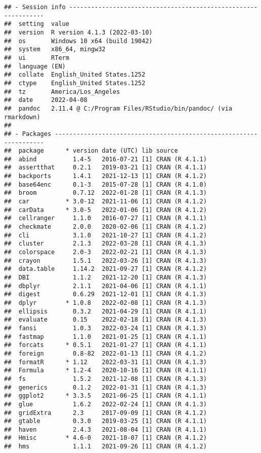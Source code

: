 \documentclass[
]{article}
\begin{document}
\begin{verbatim}
## - Session info ---------------------------------------------------------------
##  setting  value
##  version  R version 4.1.3 (2022-03-10)
##  os       Windows 10 x64 (build 19042)
##  system   x86_64, mingw32
##  ui       RTerm
##  language (EN)
##  collate  English_United States.1252
##  ctype    English_United States.1252
##  tz       America/Los_Angeles
##  date     2022-04-08
##  pandoc   2.11.4 @ C:/Program Files/RStudio/bin/pandoc/ (via rmarkdown)
## 
## - Packages -------------------------------------------------------------------
##  package      * version date (UTC) lib source
##  abind          1.4-5   2016-07-21 [1] CRAN (R 4.1.1)
##  assertthat     0.2.1   2019-03-21 [1] CRAN (R 4.1.1)
##  backports      1.4.1   2021-12-13 [1] CRAN (R 4.1.2)
##  base64enc      0.1-3   2015-07-28 [1] CRAN (R 4.1.0)
##  broom          0.7.12  2022-01-28 [1] CRAN (R 4.1.3)
##  car          * 3.0-12  2021-11-06 [1] CRAN (R 4.1.2)
##  carData      * 3.0-5   2022-01-06 [1] CRAN (R 4.1.2)
##  cellranger     1.1.0   2016-07-27 [1] CRAN (R 4.1.1)
##  checkmate      2.0.0   2020-02-06 [1] CRAN (R 4.1.2)
##  cli            3.1.0   2021-10-27 [1] CRAN (R 4.1.2)
##  cluster        2.1.3   2022-03-28 [1] CRAN (R 4.1.3)
##  colorspace     2.0-3   2022-02-21 [1] CRAN (R 4.1.3)
##  crayon         1.5.1   2022-03-26 [1] CRAN (R 4.1.3)
##  data.table     1.14.2  2021-09-27 [1] CRAN (R 4.1.2)
##  DBI            1.1.2   2021-12-20 [1] CRAN (R 4.1.3)
##  dbplyr         2.1.1   2021-04-06 [1] CRAN (R 4.1.1)
##  digest         0.6.29  2021-12-01 [1] CRAN (R 4.1.3)
##  dplyr        * 1.0.8   2022-02-08 [1] CRAN (R 4.1.3)
##  ellipsis       0.3.2   2021-04-29 [1] CRAN (R 4.1.1)
##  evaluate       0.15    2022-02-18 [1] CRAN (R 4.1.3)
##  fansi          1.0.3   2022-03-24 [1] CRAN (R 4.1.3)
##  fastmap        1.1.0   2021-01-25 [1] CRAN (R 4.1.1)
##  forcats      * 0.5.1   2021-01-27 [1] CRAN (R 4.1.1)
##  foreign        0.8-82  2022-01-13 [1] CRAN (R 4.1.2)
##  formatR      * 1.12    2022-03-31 [1] CRAN (R 4.1.3)
##  Formula      * 1.2-4   2020-10-16 [1] CRAN (R 4.1.1)
##  fs             1.5.2   2021-12-08 [1] CRAN (R 4.1.3)
##  generics       0.1.2   2022-01-31 [1] CRAN (R 4.1.3)
##  ggplot2      * 3.3.5   2021-06-25 [1] CRAN (R 4.1.1)
##  glue           1.6.2   2022-02-24 [1] CRAN (R 4.1.3)
##  gridExtra      2.3     2017-09-09 [1] CRAN (R 4.1.2)
##  gtable         0.3.0   2019-03-25 [1] CRAN (R 4.1.1)
##  haven          2.4.3   2021-08-04 [1] CRAN (R 4.1.1)
##  Hmisc        * 4.6-0   2021-10-07 [1] CRAN (R 4.1.2)
##  hms            1.1.1   2021-09-26 [1] CRAN (R 4.1.2)

\end{verbatim}
\end{document}
